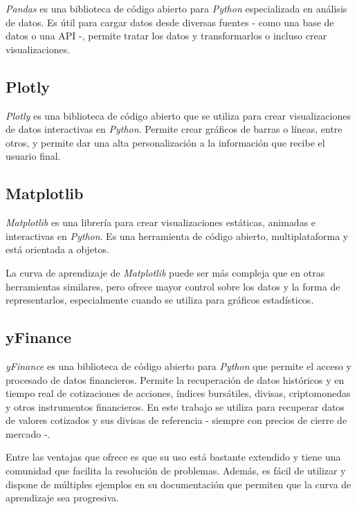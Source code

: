 \emph{Pandas} \citep{online:pandas} es una biblioteca de código abierto para \emph{Python} especializada en análisis de datos. Es útil para cargar datos desde diversas fuentes - como una base de datos o una API -, permite tratar los datos y transformarlos o incluso crear visualizaciones. 

\subsection{Plotly}\label{plotly}

\emph{Plotly} \citep{online:plotly} es una biblioteca de código abierto que se utiliza para crear visualizaciones de datos interactivas en \emph{Python}. Permite crear gráficos de barras o líneas, entre otros, y permite dar una alta personalización a la información que recibe el usuario final. 

\subsection{Matplotlib}\label{matplotlib}

\emph{Matplotlib} \citep{online:matplotlib} es una librería para crear visualizaciones estáticas, animadas e interactivas en \emph{Python}. Es una herramienta de código abierto, multiplataforma y está orientada a objetos. 

La curva de aprendizaje de \emph{Matplotlib} puede ser más compleja que en otras herramientas similares, pero ofrece mayor control sobre los datos y la forma de representarlos, especialmente cuando se utiliza para gráficos estadísticos. 

\subsection{yFinance}\label{yfinance}

\emph{yFinance} \citep{online:yfinance} es una biblioteca de código abierto para \emph{Python} que permite el acceso y procesado de datos financieros. Permite la recuperación de datos históricos y en tiempo real de cotizaciones de acciones, índices bursátiles, divisas, criptomonedas y otros instrumentos financieros. En este trabajo se utiliza para recuperar datos de valores cotizados y sus divisas de referencia - siempre con precios de cierre de mercado -. 

Entre las ventajas que ofrece es que su uso está bastante extendido y tiene una comunidad que facilita la resolución de problemas. Además, es fácil de utilizar y dispone de múltiples ejemplos en su documentación que permiten que la curva de aprendizaje sea progresiva. 

